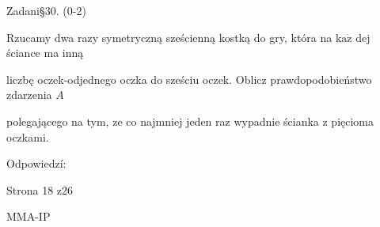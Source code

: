 \documentclass[a4paper,12pt]{article}
\begin{document}
Zadani\S 30. (0-2)

Rzucamy dwa razy symetryczną sześcienną kostką do gry, która na $\mathrm{k}\mathrm{a}\dot{\mathrm{z}}$ dej ściance ma inną

liczbę oczek-odjednego oczka do sześciu oczek. Oblicz prawdopodobieństwo zdarzenia $A$

polegającego na tym, ze co najmniej jeden raz wypadnie ścianka z pięcioma oczkami.

Odpowiedzí:

Strona 18 z26

MMA-IP
\end{document}
